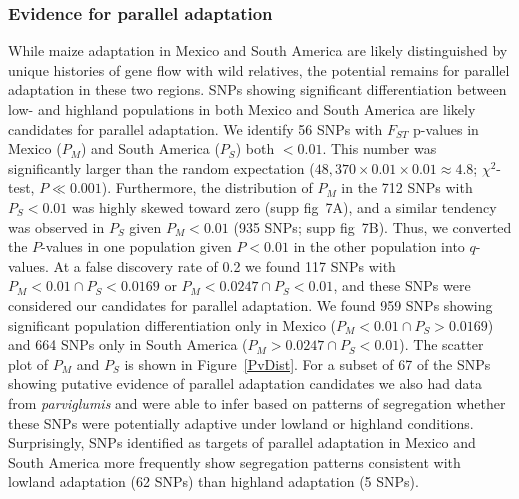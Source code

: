 {{{\subsubsection{Evidence for parallel adaptation}

While maize adaptation in Mexico and South America are likely distinguished by unique histories of gene flow with wild relatives, the potential remains for parallel adaptation in these two regions.  
SNPs showing significant differentiation between low- and highland populations in both Mexico and South America are likely candidates for parallel adaptation. 
We identify 56 SNPs with $F_{ST}$ p-values in Mexico ($P_M$) and South America ($P_S$) both $<0.01$.   
This number  was significantly larger than the random expectation ($48,370\times 0.01 \times 0.01 \approx 4.8$; $\chi^2$-test, $P\ll0.001$).  Furthermore, the distribution of $P_M$ in the 712 SNPs with $P_S<0.01$ was highly skewed toward zero (supp fig~7A), and a similar tendency was observed in $P_S$ given $P_M<0.01$ (935 SNPs; supp fig~7B).  Thus, we converted the $P$-values in one population given $P<0.01$ in the other population into $q$-values.  
At a false discovery rate of 0.2 we found 117 SNPs with $P_M<0.01 \cap P_S < 0.0169$ or $P_M<0.0247 \cap P_S < 0.01$, and these SNPs were considered our candidates for parallel adaptation.
We found 959 SNPs showing significant population differentiation only in Mexico ($P_M<0.01 \cap P_S > 0.0169$) and 664 SNPs only in South America  ($P_M>0.0247 \cap P_S < 0.01$).  The scatter plot of $P_M$ and $P_S$ is shown in Figure~\ref{PvDist}.  
For a subset of 67 of the SNPs showing putative evidence of parallel adaptation candidates we also had data from \textit{parviglumis} and were able to infer based on patterns of segregation whether these SNPs were potentially adaptive under lowland or highland conditions.  Surprisingly, SNPs identified as targets of parallel adaptation in Mexico and South America more frequently show segregation patterns consistent with lowland adaptation (62 SNPs) than highland adaptation (5 SNPs). %
%
}}}
